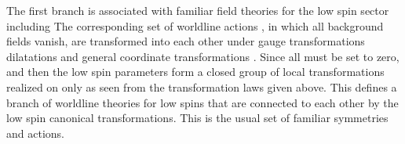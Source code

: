 \documentclass[a4paper,12pt]{article}
\begin{document}
The first branch is associated with familiar field theories for the low spin
sector including \coordHE{} The corresponding set of
worldline actions \coordHE{}, in which all background fields \coordHE{} vanish, are transformed into each other under gauge transformations \coordHE{} dilatations \coordHE{} and
general coordinate transformations \coordHE{}. Since \coordHE{} all \coordHE{} must be set to zero, and then the low
spin parameters \coordHE{}
form a closed group of local transformations realized on only \coordHE{} as seen from the transformation laws given above. This
defines a branch of worldline theories for low spins that are connected to
each other by the low spin canonical transformations. This is the usual set
of familiar symmetries and actions.
\end{document}
